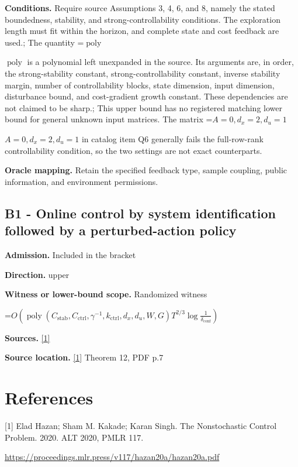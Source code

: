\documentclass[10pt,a4paper]{article}
\newcommand{\AtlasMath}[1]{\par\begingroup\centering\setbox0=\hbox{$\displaystyle #1$}\ifdim\wd0>1.4\linewidth\typeout{ATLAS WIDE FORMULA: \the\wd0}\fi\ifdim\wd0>\linewidth\resizebox{\linewidth}{!}{\box0}\else\box0\fi\par\endgroup}
\newcommand{\AtlasInlineMath}[1]{\begingroup\setbox0=\hbox{$#1$}\ifdim\wd0>.4\linewidth\endgroup\AtlasMath{#1}\else\endgroup$#1$\fi}
\begin{document}
\textbf{Conditions.} Require source Assumptions 3, 4, 6, and 8, namely the stated boundedness, stability, and strong-controllability conditions. The exploration length must fit within the horizon, and complete state and cost feedback are used.; The quantity \AtlasInlineMath{\operatorname{poly}} is a polynomial left unexpanded in the source. Its arguments are, in order, the strong-stability constant, strong-controllability constant, inverse stability margin, number of controllability blocks, state dimension, input dimension, disturbance bound, and cost-gradient growth constant. These dependencies are not claimed to be sharp.; This upper bound has no registered matching lower bound for general unknown input matrices. The matrix \AtlasInlineMath{A=0,d_x=2,d_u=1} in catalog item Q6 generally fails the full-row-rank controllability condition, so the two settings are not exact counterparts.

\textbf{Oracle mapping.} Retain the specified feedback type, sample coupling, public information, and environment permissions.

\subsection{B1 - Online control by system identification followed by a perturbed-action policy}
\textbf{Admission.} Included in the bracket

\textbf{Direction.} upper

\textbf{Witness or lower-bound scope.} Randomized witness

\AtlasMath{O\!\left(\operatorname{poly}\!\left(C_{\mathrm{stab}},C_{\mathrm{ctrl}},\gamma^{-1},k_{\mathrm{ctrl}},d_x,d_u,W,G\right)T^{2/3}\log\!\frac1{\delta_{\mathrm{conf}}}\right)}
\textbf{Sources.} \href{https://proceedings.mlr.press/v117/hazan20a/hazan20a.pdf}{[1]}

\textbf{Source location.} \href{https://proceedings.mlr.press/v117/hazan20a/hazan20a.pdf}{[1]} Theorem 12, PDF p.7

\section{References}
[1] Elad Hazan; Sham M. Kakade; Karan Singh. The Nonstochastic Control Problem. 2020. ALT 2020, PMLR 117.

\url{https://proceedings.mlr.press/v117/hazan20a/hazan20a.pdf}
\end{document}
